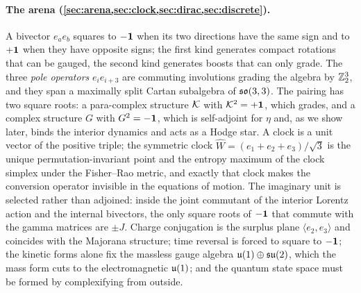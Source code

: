 \paragraph{The arena (\cref{sec:arena,sec:clock,sec:dirac,sec:discrete}).} A bivector $e_ae_b$ squares to $-\mathbf 1$ when its
two directions have the same sign and to $+\mathbf 1$ when they have opposite signs; the first kind generates compact rotations
that can be gauged, the second kind generates boosts that can only grade. The three \emph{pole operators}
$e_ie_{i+3}$ are commuting involutions grading the algebra by $\mathbb{Z}_2^3$, and they span a maximally split Cartan
subalgebra of $\mathfrak{so}(3,3)$. The pairing has two square roots: a para-complex structure $\mathcal K$ with $\mathcal K^2=+\mathbf 1$, which grades,
and a complex structure $G$ with $G^2=-\mathbf 1$, which is self-adjoint for $\eta$ and, as we show later, binds the interior
dynamics and acts as a Hodge star. A clock is a unit vector of the positive triple; the symmetric clock
$\widehat W=(e_1+e_2+e_3)/\sqrt3$ is the unique permutation-invariant point and the entropy maximum of the clock simplex
under the Fisher--Rao metric, and exactly that clock makes the conversion operator invisible in the equations of motion.
The imaginary unit is selected rather than adjoined: inside the joint commutant of the interior Lorentz action and the
internal bivectors, the only square roots of $-\mathbf 1$ that commute with the gamma matrices are $\pm J$. Charge conjugation is
the surplus plane $\langle e_2,e_3\rangle$ and coincides with the Majorana structure; time reversal is forced to square to
$-\mathbf 1$; the kinetic forms alone fix the massless gauge algebra $\mathfrak{u}(1)\oplus\mathfrak{su}(2)$, which the mass form cuts to the
electromagnetic $\mathfrak{u}(1)$; and the quantum state space must be formed by complexifying from outside.

